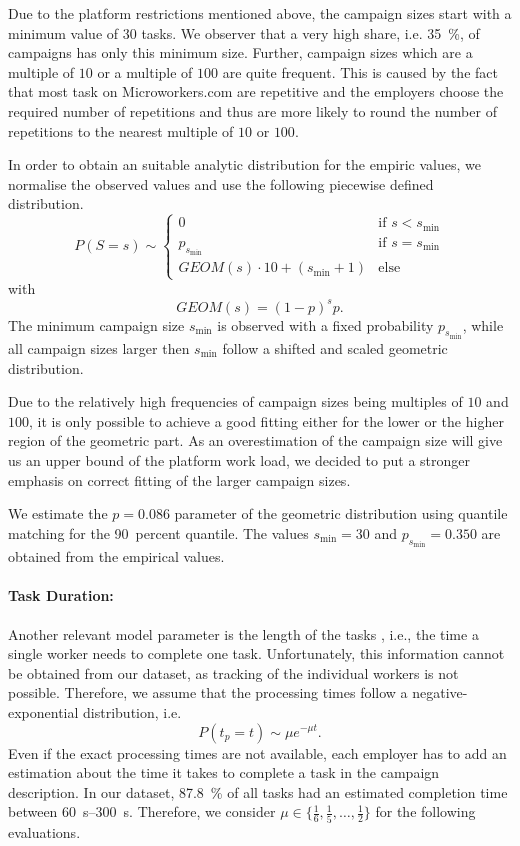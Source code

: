 Due to the platform restrictions mentioned above, the campaign sizes start with a minimum value of \(30\) tasks.
We observer that a very high share, i.e. \SI{35}{\percent}, of campaigns has only this minimum size.
Further, campaign sizes which are a multiple of \(10\) or a multiple of \(100\) are quite frequent.
This is caused by the fact that most task on Microworkers.com are repetitive and the employers choose the required number of repetitions and thus are more likely to round the number of repetitions to the nearest multiple of \(10\) or \(100\).

In order to obtain an suitable analytic distribution for the empiric values, we normalise the observed values and use the following piecewise defined distribution.
\begin{equation*}
P(S=s) \sim
\begin{cases}
  0 & \text{if } s < s_{\min}\\
  p_{s_{\min}} & \text{if } s=s_{\min} \\
  GEOM(s) \cdot 10 + (s_{\min}+1) & \text{else}
\end{cases}
\end{equation*}
with 
\begin{equation*}
GEOM(s) = {(1-p)}^s p.
\end{equation*}
The minimum campaign size \(s_{\min}\) is observed with a fixed probability \(p_{s_{\min}}\), while all campaign sizes larger then \(s_{\min}\) follow a shifted and scaled geometric distribution.

Due to the relatively high frequencies of campaign sizes being multiples of \(10\) and \(100\), it is only possible to achieve a good fitting either for the lower or the higher region of the geometric part.
As an overestimation of the campaign size will give us an upper bound of the platform work load, we decided to put a stronger emphasis on correct fitting of the larger campaign sizes.

We estimate the \(p=0.086\) parameter of the geometric distribution using quantile matching for the \SI{90}{percent} quantile.
The values \(s_{\min}=30\) and \(p_{s_{\min}}=0.350\) are obtained from the empirical values.

\paragraph*{Task Duration: }Another relevant model parameter is the length of the tasks \taskDuration, i.e., the time a single worker needs to complete one task.
Unfortunately, this information cannot be obtained from our dataset, as tracking of the individual workers is not possible.
Therefore, we assume that the processing times follow a negative-exponential distribution, i.e.
\begin{equation*}
P(t_p=t) \sim \mu  e^{-{\mu}t}.
\end{equation*}
Even if the exact processing times are not available, each employer has to add an estimation about the time it takes to complete a task in the campaign description.
In our dataset, \SI{87.8}{\percent} of all tasks had an estimated completion time between \SIrange{60}{300}{\second}.
Therefore, we consider \(\mu \in \{\frac{1}{6},\frac{1}{5},\hdots,\frac{1}{2}\}\) for the following evaluations.

